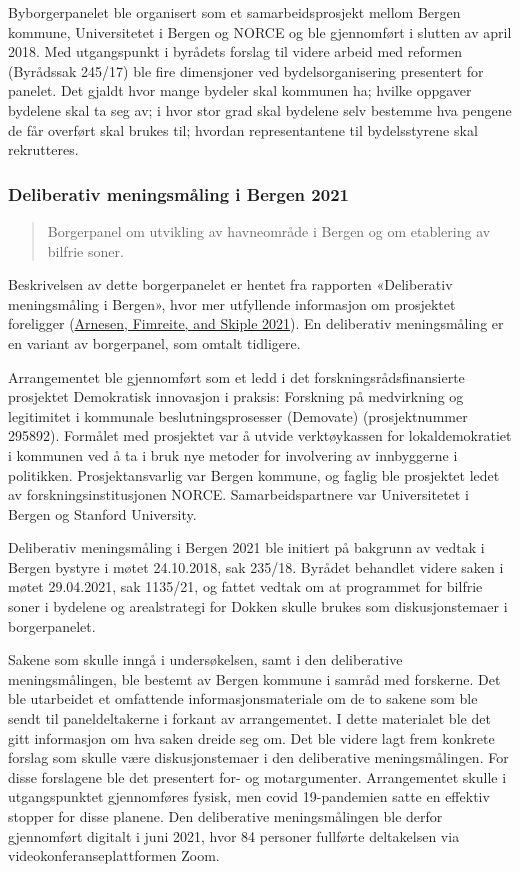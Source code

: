 \documentclass[
  12pt,
  a4paper, 12pt]{article}
\begin{document}
Byborgerpanelet ble organisert som et samarbeidsprosjekt mellom Bergen kommune, Universitetet i Bergen og NORCE og ble gjennomført i slutten av april 2018. Med utgangspunkt i byrådets forslag til videre arbeid med reformen (Byrådssak 245/17) ble fire dimensjoner ved bydelsorganisering presentert for panelet. Det gjaldt hvor mange bydeler skal kommunen ha; hvilke oppgaver bydelene skal ta seg av; i hvor stor grad skal bydelene selv bestemme hva pengene de får overført skal brukes til; hvordan representantene til bydelsstyrene skal rekrutteres.

\hypertarget{deliberativ-meningsmuxe5ling-i-bergen-2021}{%
\subsubsection{Deliberativ meningsmåling i Bergen 2021}\label{deliberativ-meningsmuxe5ling-i-bergen-2021}}

\begin{quote}
Borgerpanel om utvikling av havneområde i Bergen og om etablering av bilfrie soner.
\end{quote}

Beskrivelsen av dette borgerpanelet er hentet fra rapporten «Deliberativ meningsmåling i Bergen», hvor mer utfyllende informasjon om prosjektet foreligger (\protect\hyperlink{ref-arnesendelib2021}{Arnesen, Fimreite, and Skiple 2021}). En deliberativ meningsmåling er en variant av borgerpanel, som omtalt tidligere.

Arrangementet ble gjennomført som et ledd i det forskningsrådsfinansierte prosjektet Demokratisk innovasjon i praksis: Forskning på medvirkning og legitimitet i kommunale beslutningsprosesser (Demovate) (prosjektnummer 295892). Formålet med prosjektet var å utvide verktøykassen for lokaldemokratiet i kommunen ved å ta i bruk nye metoder for involvering av innbyggerne i politikken. Prosjektansvarlig var Bergen kommune, og faglig ble prosjektet ledet av forskningsinstitusjonen NORCE. Samarbeidspartnere var Universitetet i Bergen og Stanford University.

Deliberativ meningsmåling i Bergen 2021 ble initiert på bakgrunn av vedtak i Bergen bystyre i møtet 24.10.2018, sak 235/18. Byrådet behandlet videre saken i møtet 29.04.2021, sak 1135/21, og fattet vedtak om at programmet for bilfrie soner i bydelene og arealstrategi for Dokken skulle brukes som diskusjonstemaer i borgerpanelet.

Sakene som skulle inngå i undersøkelsen, samt i den deliberative meningsmålingen, ble bestemt av Bergen kommune i samråd med forskerne. Det ble utarbeidet et omfattende informasjonsmateriale om de to sakene som ble sendt til paneldeltakerne i forkant av arrangementet. I dette materialet ble det gitt informasjon om hva saken dreide seg om. Det ble videre lagt frem konkrete forslag som skulle være diskusjonstemaer i den deliberative meningsmålingen. For disse forslagene ble det presentert for- og motargumenter. Arrangementet skulle i utgangspunktet gjennomføres fysisk, men covid 19-pandemien satte en effektiv stopper for disse planene. Den deliberative meningsmålingen ble derfor gjennomført digitalt i juni 2021, hvor 84 personer fullførte deltakelsen via videokonferanseplattformen Zoom.
\end{document}
